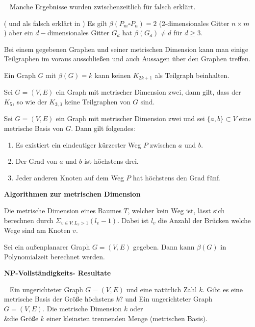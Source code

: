 ~\newline
Manche Ergebnisse wurden zwischenzeitlich für falsch erklärt. 
\begin{lem}(\cite{landmarks} und als falsch erklärt in \cite{somefamiliesofgraphs})
Es gilt $\beta(P_m \square P_n)=2$ (2-dimensionales Gitter $n \times m$) aber ein $d-$dimensionales Gitter $G_d$ hat $\beta(G_d) \neq d$ für $d \geq 3$.
\end{lem}
Bei einem gegebenen Graphen und seiner metrischen Dimension kann man einige Teilgraphen im voraus ausschließen und auch Aussagen über den Graphen treffen.
\begin{lem}
Ein Graph $G$ mit $\beta(G) = k$ kann keinen $K_{2k+1}$ als Teilgraph beinhalten.\cite{landmarks}
\end{lem}
\begin{lem}\cite{landmarks}
Sei $G = (V, E)$ ein Graph mit metrischer Dimension zwei, dann gilt, dass der $K_{5}$, so wie der $K_{3,3}$ keine Teilgraphen von $G$ sind.
\end{lem}
\begin{lem}\cite{landmarks}
Sei $G = (V, E)$ ein Graph mit metrischer Dimension zwei und sei $\{a, b\} \subset V$ eine metrische Basis von $G$. Dann gilt folgendes:
\begin{enumerate}
\item Es existiert ein eindeutiger kürzester Weg $P$ zwischen $a$ und $b$.
\item Der Grad von $a$ und $b$ ist höchstens drei.
\item Jeder anderen Knoten auf dem Weg $P$ hat höchstens den Grad fünf.
\end{enumerate}
\end{lem}
\textbf{Algorithmen zur metrischen Dimension}
\begin{lem}\cite{landmarks} 
Die metrische Dimension eines Baumes $T$, welcher kein Weg ist, lässt sich berechnen durch $\Sigma_{v \in V:L_v >1} (l_v-1)$. Dabei ist $l_v$ die Anzahl der Brücken welche Wege sind am Knoten $v$.
\end{lem}
\begin{lem}\cite{onthecomplexity}
Sei ein außenplanarer Graph $G=(V,E)$ gegeben. Dann kann $\beta(G)$ in Polynomialzeit berechnet werden.
\end{lem}
\textbf{NP-Vollständigkeits- Resultate}
\begin{defi}~\newline
\vspace{-7mm}
{Ein ungerichteter Graph $G=(V,E)$ und eine natürlich Zahl $k$.}
{Gibt es eine metrische Basis der Größe höchstens $k$?}
\vspace{-2mm}
\centering und
\vspace{-1mm}
{Ein ungerichteter Graph $G=(V,E)$.}
{Die metrische Dimension $k$ oder\\&die Größe $k$ einer kleinsten trennenden Menge (metrischen Basis).}
\end{defi}
